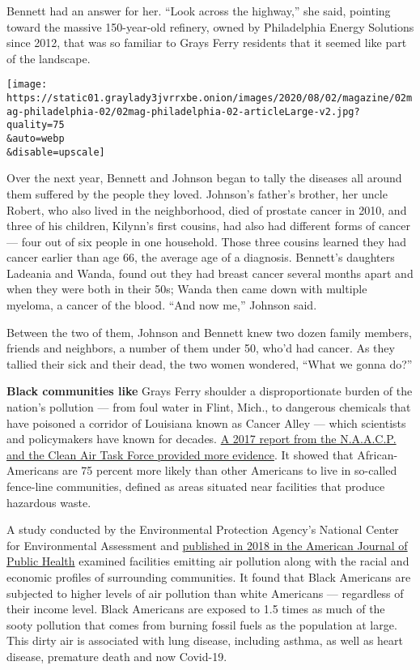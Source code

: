 Bennett had an answer for her. ``Look across the highway,'' she said,
pointing toward the massive 150-year-old refinery, owned by Philadelphia
Energy Solutions since 2012, that was so familiar to Grays Ferry
residents that it seemed like part of the landscape.

\texttt{[image: https://static01.graylady3jvrrxbe.onion/images/2020/08/02/magazine/02mag-philadelphia-02/02mag-philadelphia-02-articleLarge-v2.jpg?quality=75\\\&auto=webp\\\&disable=upscale]}

Over the next year, Bennett and Johnson began to tally the diseases all
around them suffered by the people they loved. Johnson's father's
brother, her uncle Robert, who also lived in the neighborhood, died of
prostate cancer in 2010, and three of his children, Kilynn's first
cousins, had also had different forms of cancer --- four out of six
people in one household. Those three cousins learned they had cancer
earlier than age 66, the average age of a diagnosis. Bennett's daughters
Ladeania and Wanda, found out they had breast cancer several months
apart and when they were both in their 50s; Wanda then came down with
multiple myeloma, a cancer of the blood. ``And now me,'' Johnson said.

Between the two of them, Johnson and Bennett knew two dozen family
members, friends and neighbors, a number of them under 50, who'd had
cancer. As they tallied their sick and their dead, the two women
wondered, ``What we gonna do?''

\textbf{Black communities like} Grays Ferry shoulder a disproportionate
burden of the nation's pollution --- from foul water in Flint, Mich., to
dangerous chemicals that have poisoned a corridor of Louisiana known as
Cancer Alley --- which scientists and policymakers have known for
decades.
\href{https://www.naacp.org/wp-content/uploads/2017/11/Fumes-Across-the-Fence-Line_NAACP-and-CATF-Study.pdf}{A
2017 report from the N.A.A.C.P. and the Clean Air Task Force provided
more evidence}. It showed that African-Americans are 75 percent more
likely than other Americans to live in so-called fence-line communities,
defined as areas situated near facilities that produce hazardous waste.

A study conducted by the Environmental Protection Agency's National
Center for Environmental Assessment and
\href{https://mail.google.com/mail/u/0/\#inbox/FMfcgxwJXCCfnFTwVGjRcSPbJCghDlCL}{published
in 2018 in the American Journal of Public Health} examined facilities
emitting air pollution along with the racial and economic profiles of
surrounding communities. It found that Black Americans are subjected to
higher levels of air pollution than white Americans --- regardless of
their income level. Black Americans are exposed to 1.5 times as much of
the sooty pollution that comes from burning fossil fuels as the
population at large. This dirty air is associated with lung disease,
including asthma, as well as heart disease, premature death and now
Covid-19.

